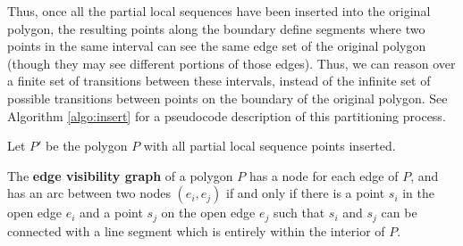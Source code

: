 \documentclass[]{styles/svproc}  %
\begin{document}
Thus, once all the partial local sequences have been inserted into the original
polygon, the resulting points along the boundary define segments where two points in the same interval can see the same edge set of the
original polygon (though they may see different portions of those edges). Thus,
we can reason over a finite set of transitions between these intervals, instead
of the infinite set of possible transitions between points on the boundary of
the original polygon. See Algorithm \ref{algo:insert} for a pseudocode
description of this partitioning process.

Let $P'$ be the polygon $P$ with all partial local sequence points inserted.

\begin{definition}
The \textbf{edge visibility graph} of a polygon $P$ has a node for each edge of
$P$, and has an arc between two nodes $(e_i, e_j)$ if and only if there is a
point $s_i$ in the open edge $e_i$ and a point $s_j$ on the open edge $e_j$ such
that $s_i$ and $s_j$ can be connected with a line segment which is entirely
within the interior of $P$.
\end{definition}

%
%
%
\end{document}
